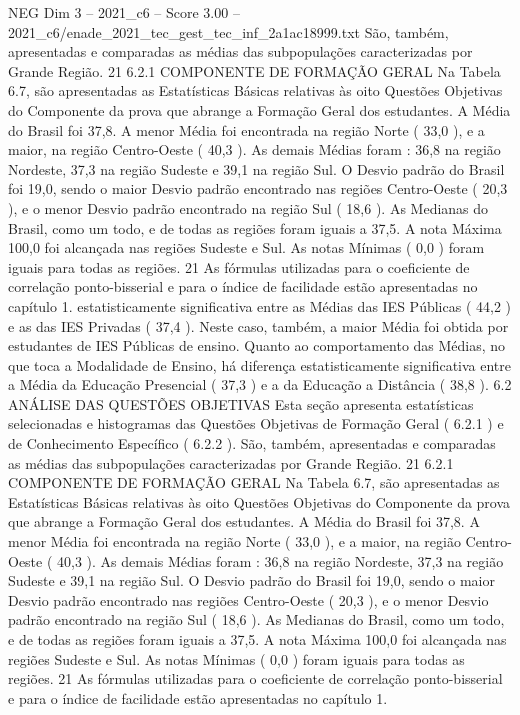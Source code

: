 \begin{textsample}{NEG Dim 3 – 2021\_c6 – Score 3.00 – 2021\_c6/enade\_2021\_tec\_gest\_tec\_inf\_2a1ac18999.txt}
São, também, apresentadas e comparadas as médias das subpopulações caracterizadas por Grande Região. 21 6.2.1 COMPONENTE DE FORMAÇÃO GERAL Na Tabela 6.7, são apresentadas as Estatísticas Básicas relativas às oito Questões Objetivas do Componente da prova que abrange a Formação Geral dos estudantes.
A Média do Brasil foi 37,8.
A menor Média foi encontrada na região Norte ( 33,0 ), e a maior, na região Centro-Oeste ( 40,3 ).
As demais Médias foram : 36,8 na região Nordeste, 37,3 na região Sudeste e 39,1 na região Sul.
O Desvio padrão do Brasil foi 19,0, sendo o maior Desvio padrão encontrado nas regiões Centro-Oeste ( 20,3 ), e o menor Desvio padrão encontrado na região Sul ( 18,6 ).
As Medianas do Brasil, como um todo, e de todas as regiões foram iguais a 37,5.
A nota Máxima 100,0 foi alcançada nas regiões Sudeste e Sul.
As notas Mínimas ( 0,0 ) foram iguais para todas as regiões. 21 As fórmulas utilizadas para o coeficiente de correlação ponto-bisserial e para o índice de facilidade estão apresentadas no capítulo 1. estatisticamente significativa entre as Médias das IES Públicas ( 44,2 ) e as das IES Privadas ( 37,4 ).
Neste caso, também, a maior Média foi obtida por estudantes de IES Públicas de ensino.
Quanto ao comportamento das Médias, no que toca a Modalidade de Ensino, há diferença estatisticamente significativa entre a Média da Educação Presencial ( 37,3 ) e a da Educação a Distância ( 38,8 ). 6.2 ANÁLISE DAS QUESTÕES OBJETIVAS Esta seção apresenta estatísticas selecionadas e histogramas das Questões Objetivas de Formação Geral ( 6.2.1 ) e de Conhecimento Específico ( 6.2.2 ).
São, também, apresentadas e comparadas as médias das subpopulações caracterizadas por Grande Região. 21 6.2.1 COMPONENTE DE FORMAÇÃO GERAL Na Tabela 6.7, são apresentadas as Estatísticas Básicas relativas às oito Questões Objetivas do Componente da prova que abrange a Formação Geral dos estudantes.
A Média do Brasil foi 37,8.
A menor Média foi encontrada na região Norte ( 33,0 ), e a maior, na região Centro-Oeste ( 40,3 ).
As demais Médias foram : 36,8 na região Nordeste, 37,3 na região Sudeste e 39,1 na região Sul.
O Desvio padrão do Brasil foi 19,0, sendo o maior Desvio padrão encontrado nas regiões Centro-Oeste ( 20,3 ), e o menor Desvio padrão encontrado na região Sul ( 18,6 ).
As Medianas do Brasil, como um todo, e de todas as regiões foram iguais a 37,5.
A nota Máxima 100,0 foi alcançada nas regiões Sudeste e Sul.
As notas Mínimas ( 0,0 ) foram iguais para todas as regiões. 21 As fórmulas utilizadas para o coeficiente de correlação ponto-bisserial e para o índice de facilidade estão apresentadas no capítulo 1.

\end{textsample}
